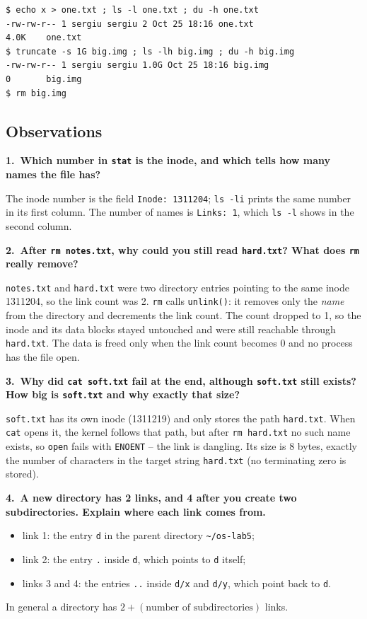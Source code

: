 \documentclass[12pt,a4paper]{article}
\newcommand{\qa}[2]{%
  \par\needspace{5\baselineskip}\medskip
  \noindent\textbf{#1.~#2}\par\smallskip\noindent}
\begin{document}
\begin{lstlisting}[style=terminal,caption={Apparent size versus allocated space}]
$ echo x > one.txt ; ls -l one.txt ; du -h one.txt
-rw-rw-r-- 1 sergiu sergiu 2 Oct 25 18:16 one.txt
4.0K    one.txt
$ truncate -s 1G big.img ; ls -lh big.img ; du -h big.img
-rw-rw-r-- 1 sergiu sergiu 1.0G Oct 25 18:16 big.img
0       big.img
$ rm big.img
\end{lstlisting}

\subsection*{Observations}

\qa{1}{Which number in \texttt{stat} is the inode, and which tells how many names the file has?}
The inode number is the field \texttt{Inode: 1311204}; \texttt{ls -li} prints the same number in its first column. The number of names is \texttt{Links: 1}, which \texttt{ls -l} shows in the second column.

\qa{2}{After \texttt{rm notes.txt}, why could you still read \texttt{hard.txt}? What does \texttt{rm} really remove?}
\texttt{notes.txt} and \texttt{hard.txt} were two directory entries pointing to the same inode 1311204, so the link count was 2. \texttt{rm} calls \texttt{unlink()}: it removes only the \textit{name} from the directory and decrements the link count. The count dropped to 1, so the inode and its data blocks stayed untouched and were still reachable through \texttt{hard.txt}. The data is freed only when the link count becomes 0 and no process has the file open.

\qa{3}{Why did \texttt{cat soft.txt} fail at the end, although \texttt{soft.txt} still exists? How big is \texttt{soft.txt} and why exactly that size?}
\texttt{soft.txt} has its own inode (1311219) and only stores the path \texttt{hard.txt}. When \texttt{cat} opens it, the kernel follows that path, but after \texttt{rm hard.txt} no such name exists, so \texttt{open} fails with \texttt{ENOENT} -- the link is dangling. Its size is 8 bytes, exactly the number of characters in the target string \texttt{hard.txt} (no terminating zero is stored).

\qa{4}{A new directory has 2 links, and 4 after you create two subdirectories. Explain where each link comes from.}
\begin{itemize}
  \item link 1: the entry \texttt{d} in the parent directory \texttt{\textasciitilde/os-lab5};
  \item link 2: the entry \texttt{.} inside \texttt{d}, which points to \texttt{d} itself;
  \item links 3 and 4: the entries \texttt{..} inside \texttt{d/x} and \texttt{d/y}, which point back to \texttt{d}.
\end{itemize}
In general a directory has $2 + (\text{number of subdirectories})$ links.
\end{document}
